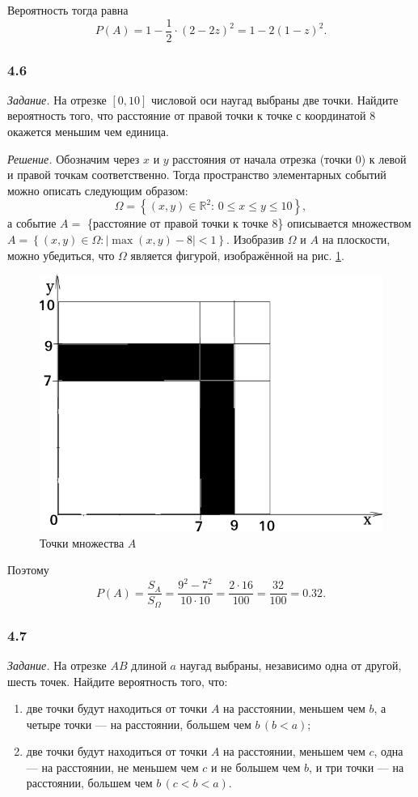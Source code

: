 Вероятность тогда равна
$$P \left( A \right) =
1 - \frac{1}{2} \cdot \left( 2-2z \right)^2 =
1 - 2 \left( 1-z \right)^2.$$

\subsubsection*{4.6}

\textit{Задание.} На отрезке $ \left[ 0, 10 \right] $ числовой оси наугад выбраны две точки.
Найдите вероятность того, что расстояние от правой точки к точке с координатой $8$ окажется меньшим чем единица.

\textit{Решение.} Обозначим через $x$ и $y$ расстояния от начала отрезка (точки $0$) к левой и правой точкам соответственно.
Тогда пространство элементарных событий можно описать следующим образом:
$$ \Omega =
\left\{ \left( x, y \right) \in \mathbb{R}^2: \,
0 \leq x  \leq y \leq 10 \right\},$$
а событие $A =$
\{расстояние от правой точки к точке 8\} описывается множеством $A = \left\{ \left( x, y \right) \in \Omega: \left| \max \left( x, y \right) - 8 \right| < 1 \right\} $.
Изобразив $ \Omega $ и $A$ на плоскости, можно убедиться, что $ \Omega $ является фигурой, изображённой на рис. \ref{fig:46}.

\begin{figure}[h!]
  \centering
  \includegraphics[width=.4\textwidth]{./pictures/4_6.png}
  \caption{Точки множества $A$}
  \label{fig:46}
\end{figure}

Поэтому
$$P \left( A \right) =
\frac{S_A}{S_{ \Omega }} =
\frac{9^2-7^2}{10 \cdot 10} =
\frac{2 \cdot 16}{100} =
\frac{32}{100} =
0.32.$$

\subsubsection*{4.7}

\textit{Задание.} На отрезке $AB$ длиной $a$ наугад выбраны, независимо одна от другой, шесть точек.
Найдите вероятность того, что:
\begin{enumerate}[label=\alph*)]
\item две точки будут находиться от точки $A$ на расстоянии, меньшем чем $b$, а четыре точки --- на расстоянии, большем чем $b \, \left(b<a \right) $;
\item две точки будут находиться от точки $A$ на расстоянии, меньшем чем $c$, одна --- на расстоянии, не меньшем чем $c$ и не большем чем $b$,
и три точки --- на расстоянии, большем чем $b \, \left( c<b<a \right) $.
\end{enumerate}

